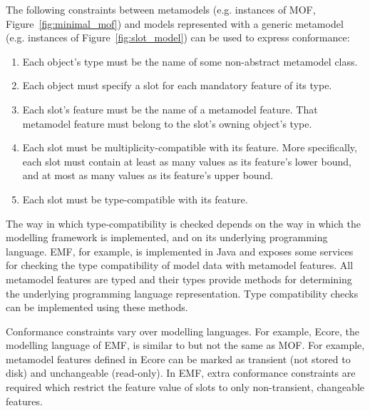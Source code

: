 The following constraints between metamodels (e.g. instances of MOF, Figure~\ref{fig:minimal_mof}) and models represented with a generic metamodel (e.g. instances of Figure~\ref{fig:slot_model}) can be used to express conformance:

\begin{enumerate}
	\item Each object's type must be the name of some non-abstract metamodel class.
	\item Each object must specify a slot for each mandatory feature of its type.
	\item Each slot's feature must be the name of a metamodel feature. That metamodel feature must belong to the slot's owning object's type.
	\item Each slot must be multiplicity-compatible with its feature. More specifically, each slot must contain at least as many values as its feature's lower bound, and at most as many values as its feature's upper bound.
  \item Each slot must be type-compatible with its feature.
\end{enumerate}

The way in which type-compatibility is checked depends on the way in which the modelling framework is implemented, and on its underlying programming language. EMF, for example, is implemented in Java and exposes some services for checking the type compatibility of model data with metamodel features. All metamodel features are typed and their types provide methods for determining the underlying programming language representation. Type compatibility checks can be implemented using these methods.

Conformance constraints vary over modelling languages. For example, Ecore, the modelling language of EMF, is similar to but not the same as MOF. For example, metamodel features defined in Ecore can be marked as transient (not stored to disk) and unchangeable (read-only). In EMF, extra conformance constraints are required which restrict the feature value of slots to only non-transient, changeable features.


